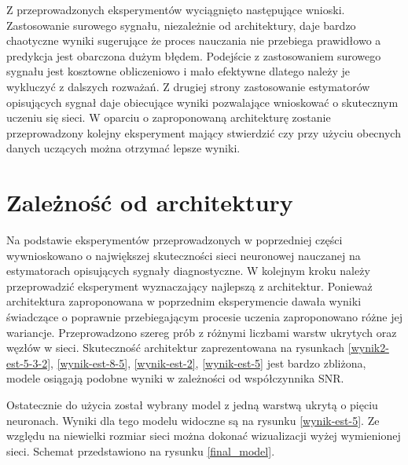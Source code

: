 \documentclass[inzynierska]{pwr_wmat_praca_dyplomowa}
\theoremstyle{plain}
\numberwithin{theorem}{chapter}
\theoremstyle{definition}
\numberwithin{theorem}{chapter}
\begin{document}
Z przeprowadzonych eksperymentów wyciągnięto następujące wnioski. Zastosowanie surowego sygnału, niezależnie od architektury, daje bardzo chaotyczne wyniki sugerujące że proces nauczania nie przebiega prawidłowo a predykcja jest obarczona dużym błędem. Podejście z zastosowaniem surowego sygnału jest kosztowne obliczeniowo i mało efektywne dlatego należy je wykluczyć z dalszych rozważań. Z drugiej strony zastosowanie estymatorów opisujących sygnał daje obiecujące wyniki pozwalające wnioskować o skutecznym uczeniu się sieci. W oparciu o zaproponowaną architekturę zostanie przeprowadzony kolejny eksperyment mający stwierdzić czy przy użyciu obecnych danych uczących można otrzymać lepsze wyniki.

\section{Zależność od architektury}
Na podstawie eksperymentów przeprowadzonych w poprzedniej części wywnioskowano o największej skuteczności sieci neuronowej nauczanej na estymatorach opisujących sygnały diagnostyczne. W kolejnym kroku należy przeprowadzić eksperyment wyznaczający najlepszą z architektur. Ponieważ architektura zaproponowana w poprzednim eksperymencie dawała wyniki świadczące o poprawnie przebiegającym procesie uczenia zaproponowano różne jej wariancje. Przeprowadzono szereg prób z różnymi liczbami warstw ukrytych oraz węzłów w sieci. Skuteczność architektur zaprezentowana na rysunkach \ref{wynik2-est-5-3-2}, \ref{wynik-est-8-5}, \ref{wynik-est-2}, \ref{wynik-est-5} jest bardzo zbliżona, modele osiągają podobne wyniki w zależności od współczynnika SNR.

 Ostatecznie do użycia został wybrany model z jedną warstwą ukrytą o pięciu neuronach. Wyniki dla tego modelu widoczne są na rysunku \ref{wynik-est-5}. Ze względu na niewielki rozmiar sieci można dokonać wizualizacji wyżej wymienionej sieci. Schemat przedstawiono na rysunku \ref{final_model}. 
\end{document}
